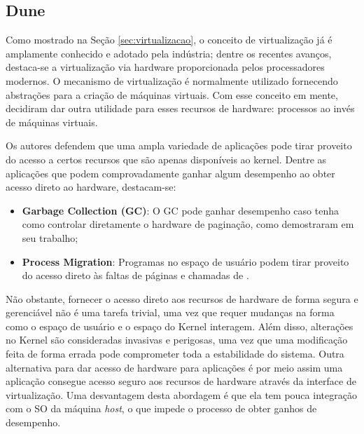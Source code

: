 \subsection{Dune}
\label{sec:dune}

Como mostrado na Seção \ref{sec:virtualizacao}, o conceito de virtualização já
é amplamente conhecido e adotado pela indústria; dentre os recentes avanços,
destaca-se a virtualização via hardware proporcionada pelos processadores
modernos. O mecanismo de virtualização é normalmente utilizado fornecendo
abstrações para a criação de máquinas virtuais. Com esse conceito em mente,
\citet{belay} decidiram dar outra utilidade para esses recursos de hardware:
 processos ao invés de máquinas virtuais.

Os autores defendem que uma ampla variedade de aplicações pode tirar proveito
do acesso a certos recursos que são apenas disponíveis ao kernel. Dentre as
aplicações que podem comprovadamente ganhar algum desempenho ao obter acesso
direto ao hardware, destacam-se:

\begin{itemize}
  \item \textbf{Garbage Collection (GC)}: O GC pode ganhar desempenho caso
        tenha como controlar diretamente o hardware de paginação, como
        \citet{pauseless} demostraram em seu trabalho;
  \item \textbf{Process Migration}: Programas no espaço de usuário podem tirar
        proveito do acesso direto às faltas de páginas e chamadas de .
\end{itemize}

Não obstante, fornecer o acesso direto aos recursos de hardware de forma segura
e gerenciável não é uma tarefa trivial, uma vez que requer mudanças na forma
como o espaço de usuário e o espaço do Kernel interagem. Além disso, alterações
no Kernel são consideradas invasivas e perigosas, uma vez que uma modificação
feita de forma errada pode comprometer toda a estabilidade do sistema. Outra
alternativa para dar acesso de hardware para aplicações é por meio  assim uma aplicação consegue acesso seguro aos recursos de
hardware através da interface de virtualização. Uma desvantagem desta abordagem
é que ela tem pouca integração com o SO da máquina \emph{host}, o que impede o
processo de obter ganhos de desempenho.

